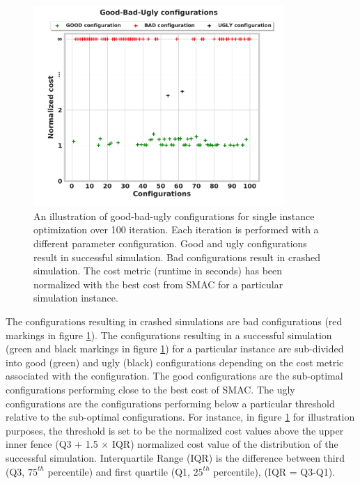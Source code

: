 \begin{figure}[!ht]
\centering
\includegraphics[width=0.85\textwidth]{images/Good_bad_ugly_cost.pdf}
\captionsetup{justification=justified}
\caption[An illustration of good-bad-ugly configurations from SMAC]{An illustration of good-bad-ugly configurations for single instance optimization over 100 iteration. Each iteration is performed with a different parameter configuration. Good and ugly configurations result in successful simulation. Bad configurations result in crashed simulation. The cost metric (runtime in seconds) has been normalized with the best cost from SMAC for a particular simulation instance.}
\label{fig:good-bad-ugly}
\end{figure}



The configurations resulting in crashed simulations are bad configurations (red markings in figure \ref{fig:good-bad-ugly}). The configurations resulting in a successful simulation (green and black markings in figure \ref{fig:good-bad-ugly}) for a particular instance are sub-divided into good (green) and ugly (black) configurations depending on the cost metric associated with the configuration. The good configurations are the sub-optimal configurations performing close to the best cost of SMAC. The ugly configurations are the configurations performing below a particular threshold relative to the sub-optimal configurations. For instance, in figure \ref{fig:good-bad-ugly} for illustration purposes, the threshold is set to be the normalized cost values above the upper inner fence (Q3 + 1.5 $\times$ IQR) \cite{outlier} normalized cost value of the distribution of the successful simulation. Interquartile Range (IQR) is the difference between third (Q3, $75^{th}$ percentile) and first quartile (Q1, $25^{th}$ percentile), (IQR = Q3-Q1).

